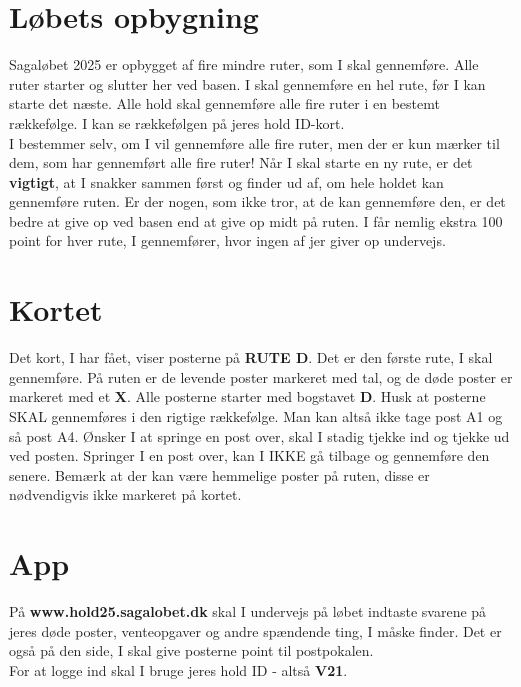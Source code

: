 \section{Løbets opbygning}
Sagaløbet 2025 er opbygget af fire mindre ruter, som I skal gennemføre. Alle ruter starter og slutter her ved basen. I skal gennemføre en hel rute, før I kan starte det næste. Alle hold skal gennemføre alle fire ruter i en bestemt rækkefølge. I kan se rækkefølgen på jeres hold ID-kort.\\\newline
I bestemmer selv, om I vil gennemføre alle fire ruter, men der er kun mærker til dem, som har gennemført alle fire ruter! Når I skal starte en ny rute, er det \textbf{vigtigt}, at I snakker sammen først og finder ud af, om hele holdet kan gennemføre ruten. Er der nogen, som ikke tror, at de kan gennemføre den, er det bedre at give op ved basen end at give op midt på ruten. I får nemlig ekstra 100 point for hver rute, I gennemfører, hvor ingen af jer giver op undervejs.\\
\section{Kortet}
Det kort, I har fået, viser posterne på \textbf{RUTE D}. Det er den første rute, I skal gennemføre. På ruten er de levende poster markeret med tal, og de døde poster er markeret med et \textbf{X}. Alle posterne starter med bogstavet \textbf{D}. Husk at posterne SKAL gennemføres i den rigtige rækkefølge. Man kan altså ikke tage post A1 og så post A4. Ønsker I at springe en post over, skal I stadig tjekke ind og tjekke ud ved posten. Springer I en post over, kan I IKKE gå tilbage og gennemføre den senere. Bemærk at der kan være hemmelige poster på ruten, disse er nødvendigvis ikke markeret på kortet.
\section{App}
På \textbf{www.hold25.sagalobet.dk} skal I undervejs på løbet indtaste svarene på jeres døde poster, venteopgaver og andre spændende ting, I måske finder. Det er også på den side, I skal give posterne point til postpokalen.\\
For at logge ind skal I bruge jeres hold ID - altså \textbf{V21}.
\newpage
